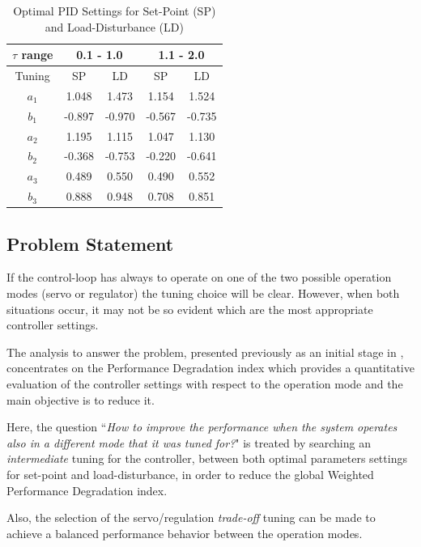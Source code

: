 \begin{table}[htb!]
\begin{center}
\caption{Optimal PID Settings for Set-Point (SP) and
Load-Disturbance (LD)} \label{optimal_settings}
\begin{tabular}{c|cc|cc}
\hline \textbf{$\tau$ range} & \multicolumn{2}{c}{\textbf{0.1 -
1.0}} & \multicolumn{2}{c}{\textbf{1.1 - 2.0}} \\ \hline Tuning &
SP & LD & SP & LD \\
\hline
$a_1$ &  1.048 &  1.473 &  1.154 &  1.524 \\
$b_1$ & -0.897 & -0.970 & -0.567 & -0.735 \\
$a_2$ &  1.195 &  1.115 &  1.047 &  1.130 \\
$b_2$ & -0.368 & -0.753 & -0.220 & -0.641 \\
$a_3$ &  0.489 &  0.550 &  0.490 &  0.552 \\
$b_3$ &  0.888 &  0.948 &  0.708 &  0.851 \\
\hline
\end{tabular}
\end{center}
\end{table}

\subsection{Problem Statement}
\label{problem_formulation}

If the control-loop has always to operate on one of the two
possible operation modes (servo or regulator) the tuning choice
will be clear. However, when both situations occur, it may not be
so evident which are the most appropriate controller settings.

The analysis to answer the problem, presented previously as an
initial stage in \citep{arrietaCSC2007,arrietaMED2007},
concentrates on the Performance Degradation index which provides a
quantitative evaluation of the controller settings with respect to
the operation mode and the main objective is to reduce it.

Here, the question ``\emph{How to improve the performance when the
system operates also in a different mode that it was tuned for?}"
is treated by searching an \emph{intermediate} tuning for the
controller, between both optimal parameters settings for set-point
and load-disturbance, in order to reduce the global Weighted
Performance Degradation index.

Also, the selection of the servo/regulation \emph{trade-off}
tuning can be made to achieve a balanced performance behavior
between the operation modes.

